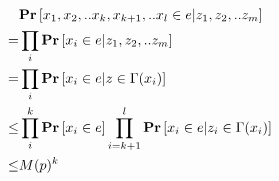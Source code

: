 \documentclass{beamer}
\begin{document}
\begin{frame}

  \begin{align*}
    &\mathbf{Pr} \left[ x_{1},x_{2}, .. x_{k}, x_{k+1}, .. x_{l} \in e | z_{1},z_{2},..z_{m}  \right]  \\
    = & \prod_{i}\mathbf{Pr} \left[ x_{i} \in e | z_{1},z_{2},..z_{m}  \right] \\ 
    = & \prod_{i}\mathbf{Pr} \left[ x_{i} \in e | z \in \Gamma(x_{i})  \right] \\ 
    \le & \prod_{i}^{k}\mathbf{Pr} \left[ x_{i} \in e \right] \prod_{i=k+1}^{l}\mathbf{Pr} \left[ x_{i} \in e | z_{i} \in \Gamma(x_{i})  \right] \\ 
    \le & M(p)^{k}  
  \end{align*}

\end{frame}
\end{document}
